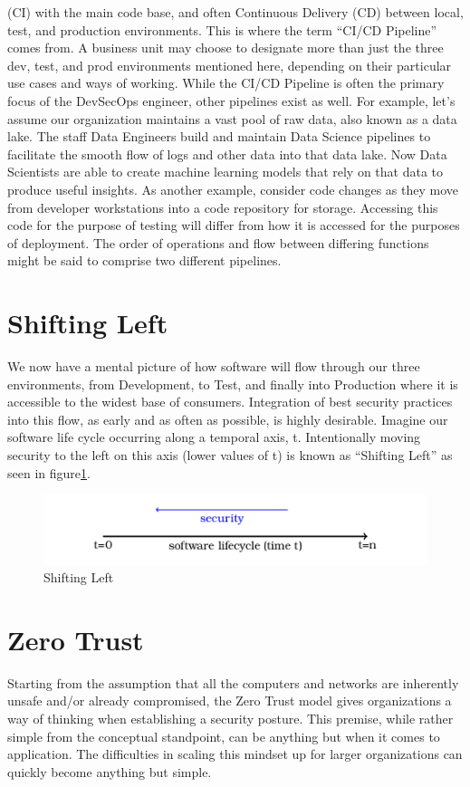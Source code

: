 (CI) with the main code base,
and often Continuous Delivery (CD)
between local, test, and production environments. This is where the term
``CI/CD Pipeline'' comes from. A business unit may choose to designate more
than just the three dev, test, and prod environments mentioned here,
depending on their particular use cases and ways of working.
\justify{}
While the CI/CD Pipeline is often the primary focus of the DevSecOps
engineer, other pipelines exist as well. For example, let's assume our
organization maintains a vast pool of raw data, also known as a data
lake. The staff Data Engineers build and maintain
Data Science pipelines to facilitate the smooth flow
of logs and other data into that data lake. Now Data Scientists are able
to create machine learning models that rely on that data to produce useful
insights. As another example, consider code changes as they move from
developer workstations into a code repository for storage. Accessing
this code for the purpose of testing will differ from how it is accessed
for the purposes of deployment. The order of operations and flow
between differing functions might be said to comprise two different pipelines.
\section{Shifting Left}
\justify{}
We now have a mental picture of how software will flow through our
three environments, from Development, to Test, and finally into Production
where it is accessible to the widest base of consumers. Integration of
best security practices into this flow, as early and as often as possible,
is highly desirable.
\justify{}
Imagine our software life cycle occurring along a temporal
axis, t. Intentionally moving security to the left on this axis (lower
values of t) is known as ``Shifting Left'' as seen in
figure\ref{shift}.
\justify{}
\begin{figure}[!htb]
\centering
\includegraphics{../images/shift_left.png}
\caption{Shifting Left}
\label{shift}
\end{figure}
\section{Zero Trust}
\justify{}
Starting from the assumption that all the computers and networks are inherently unsafe and/or
already compromised, the Zero Trust model gives organizations a way of thinking when establishing
a security
posture.\cite{zerotrust} This premise, while rather simple from
the conceptual standpoint, can be anything but when it comes to
application. The difficulties in scaling this mindset up for larger
organizations can quickly become anything but simple.
